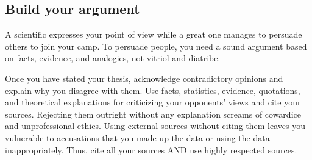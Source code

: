\documentclass{tufte-handout}\usepackage[]{graphicx}\usepackage[]{color}
\begin{document}




\subsection{Build your argument}

A scientific expresses your point of view while a great one manages to persuade others to join your camp. To persuade people, you need a sound argument based on facts, evidence, and analogies, not vitriol and diatribe. 

Once you have stated your thesis, acknowledge contradictory opinions and explain why you disagree with them. Use facts, statistics, evidence, quotations, and theoretical explanations for criticizing your opponents' views and cite your sources. Rejecting them outright without any explanation screams of cowardice and unprofessional ethics. Using external sources without citing them leaves you vulnerable to accusations that you made up the data or using the data inappropriately. Thus, cite all your sources AND use highly respected sources.
\end{document}
